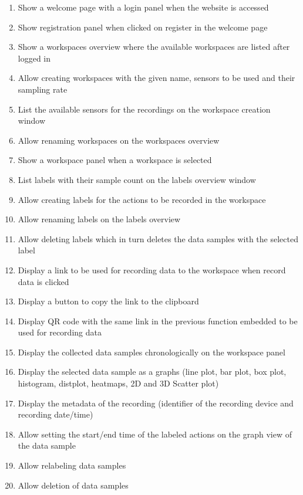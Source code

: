\begin{enumerate}[{label = \textbf{/F{\protect\twodigits{\arabic{enumi}}}0/}, leftmargin = *}]
    \item \label{/F010/} Show a welcome page with a login panel when the website is accessed
    \item Show registration panel when clicked on register in the welcome page
    \item Show a workspaces overview where the available workspaces are listed after logged in
    \item Allow creating workspaces with the given name, sensors to be used and their sampling rate
    \item List the available sensors for the recordings on the workspace creation window
    \item Allow renaming workspaces on the workspaces overview
    \item Show a workspace panel when a workspace is selected
    \item List labels with their sample count on the labels overview window
    \item Allow creating labels for the actions to be recorded in the workspace
    \item Allow renaming labels on the labels overview
    \item Allow deleting labels which in turn deletes the data samples with the selected label
    \item Display a link to be used for recording data to the workspace when record data is clicked
    \item Display a button to copy the link to the clipboard
    \item Display QR code with the same link in the previous function embedded to be used for recording data
    \item Display the collected data samples chronologically on the workspace panel
    \item Display the selected data sample as a graphs (line plot, bar plot, box plot, histogram, distplot, heatmaps, 2D and 3D Scatter plot)
    \item Display the metadata of the recording (identifier of the recording device and recording date/time)
    \item Allow setting the start/end time of the labeled actions on the graph view of the data sample
    \item Allow relabeling data samples
    \item Allow deletion of data samples

\end{enumerate}
